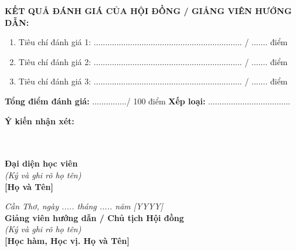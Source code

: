 \vspace{0.6cm}
\noindent\textbf{KẾT QUẢ ĐÁNH GIÁ CỦA HỘI ĐỒNG / GIẢNG VIÊN HƯỚNG DẪN:}
\begin{enumerate}[leftmargin=*,itemsep=2pt]
  \item Tiêu chí đánh giá 1: ................................................................. / ....... điểm
  \item Tiêu chí đánh giá 2: ................................................................. / ....... điểm
  \item Tiêu chí đánh giá 3: ................................................................. / ....... điểm
\end{enumerate}

\vspace{0.3cm}
\noindent\textbf{Tổng điểm đánh giá:} .............../ 100 điểm \hspace{2cm} \textbf{Xếp loại:} ....................................

\vspace{0.5cm}
\noindent\textbf{Ý kiến nhận xét:}\\
\noindent\dotfill\\
\noindent\dotfill\\
\noindent\dotfill

\vspace{1.2cm}

\noindent
\begin{minipage}[t]{0.45\textwidth}
  \centering
  \textbf{Đại diện học viên}\\
  \textit{(Ký và ghi rõ họ tên)}\\[2cm]
  \textbf{[Họ và Tên]}
\end{minipage}
\hfill
\begin{minipage}[t]{0.50\textwidth}
  \centering
  \textit{Cần Thơ, ngày ..... tháng ..... năm [YYYY]}\\
  \textbf{Giảng viên hướng dẫn / Chủ tịch Hội đồng}\\
  \textit{(Ký và ghi rõ họ tên)}\\[2cm]
  \textbf{[Học hàm, Học vị. Họ và Tên]}
\end{minipage}
